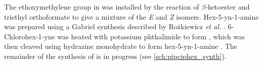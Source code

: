 
The ethoxymethylene group in  was installed by the reaction of $\beta$-ketoester  and triethyl orthoformate to give a mixture of the \textit{E} and \textit{Z} isomers\cite{Senthilkumar2009,Mitscher1986}.
Hex-5-yn-1-amine  was prepared using a Gabriel synthesis \cite{Gabriel1887} described by Rożkiewicz \textit{et al.} \cite{Rozkiewicz2006}. 6-Chlorohex-1-yne  was heated with potassium phthalimide to form , which was then cleaved using hydrazine monohydrate to form hex-5-yn-1-amine .
The remainder of the synthesis of  is in progress (see \ref{sch:pipciphex_synth}).

